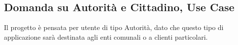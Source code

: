 \documentclass{article}
\begin{document}
\subsection{Domanda su Autorità e Cittadino, Use Case}
Il progetto è pensata per utente di tipo Autorità, dato che questo tipo di applicazione sarà destinata agli enti comunali o a clienti particolari.



\end{document}
